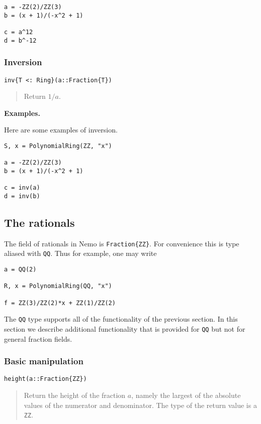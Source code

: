 \documentclass[a4paper,10pt]{article}
\newcommand{\code}{\lstinline}
\newcommand{\desc}[1]{\vspace{-3mm}\begin{quote}#1\end{quote}}
\begin{document}
{{{\begin{lstlisting}
a = -ZZ(2)/ZZ(3)
b = (x + 1)/(-x^2 + 1)

c = a^12
d = b^-12
\end{lstlisting}

\subsubsection{Inversion}

\begin{lstlisting}
inv{T <: Ring}(a::Fraction{T})
\end{lstlisting}

\desc{Return $1/a$.}

\textbf{Examples.}

Here are some examples of inversion.

\begin{lstlisting}
S, x = PolynomialRing(ZZ, "x")

a = -ZZ(2)/ZZ(3)
b = (x + 1)/(-x^2 + 1)

c = inv(a)
d = inv(b)
\end{lstlisting}

\subsection{The rationals}

The field of rationals in Nemo is \code|Fraction{ZZ}|. For convenience this is
type aliased with \code{QQ}. Thus for example, one may write

\begin{lstlisting}
a = QQ(2)

R, x = PolynomialRing(QQ, "x")

f = ZZ(3)/ZZ(2)*x + ZZ(1)/ZZ(2)
\end{lstlisting}

The \code{QQ} type supports all of the functionality of the previous section. In
this section we describe additional functionality that is provided for \code{QQ}
but not for general fraction fields.

\subsubsection{Basic manipulation}

\begin{lstlisting}
height(a::Fraction{ZZ})
\end{lstlisting}

\desc{Return the height of the fraction $a$, namely the largest of the absolute
values of the numerator and denominator. The type of the return value is a 
\code{ZZ}.}

}}}
\end{document}
